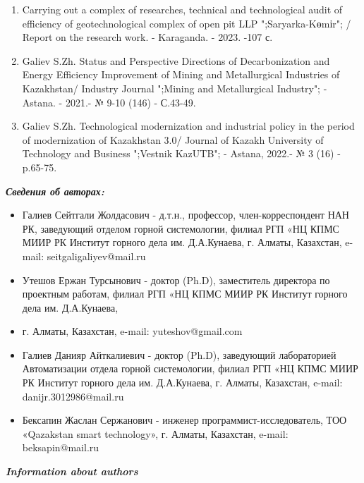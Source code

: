 \begin{enumerate}
\item
Carrying out a complex of researches, technical and technological audit of efficiency of
geotechnological complex of open pit LLP ";Saryarka-Kөmіr"; / Report on the research work. -
Karaganda. - 2023. -107 с.

\item
Galiev S.Zh. Status and Perspective Directions of Decarbonization and Energy Efficiency
Improvement of Mining and Metallurgical Industries of Kazakhstan/ Industry Journal ";Mining
and Metallurgical Industry"; - Astana. - 2021.- № 9-10 (146) - С.43-49.

\item
Galiev S.Zh. Technological modernization and industrial policy in the period of
modernization of Kazakhstan 3.0/ Journal of Kazakh University of Technology and Business
";Vestnik KazUTB"; - Astana, 2022.- № 3 (16) - p.65-75.
\end{enumerate}

\begin{center}
\emph{{\bfseries Сведения об авторах:}}
\end{center}

\begin{itemize}
\item
Галиев Сейтгали Жолдасович - д.т.н., профессор, член-корреспондент НАН
РК, заведующий отделом горной системологии, филиал РГП «НЦ КПМС МИИР РК
Институт горного дела им. Д.А.Кунаева, г. Алматы, Казахстан, e-mail:
seitgaligaliyev@mail.ru

\item
Утешов Ержан Турсынович - доктор (Ph.D), заместитель директора по
проектным работам, филиал РГП «НЦ КПМС МИИР РК Институт горного дела им.
Д.А.Кунаева,

\item
г. Алматы, Казахстан, e-mail:
yuteshov@gmail.com

\item
Галиев Данияр Айткалиевич - доктор (Ph.D), заведующий лабораторией
Автоматизации отдела горной системологии, филиал РГП «НЦ КПМС МИИР РК
Институт горного дела им. Д.А.Кунаева, г. Алматы, Казахстан, e-mail:
danijr.3012986@mail.ru

\item
Бексапин Жаслан Сержанович - инженер программист-исследователь, ТОО
«Qazakstan smart technology», г. Алматы, Казахстан, e-mail:
beksapin@mail.ru
\end{itemize}

\begin{center}
\emph{{\bfseries Information about authors}}
\end{center}

